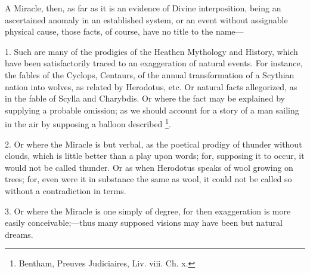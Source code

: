 A Miracle, then, as far as it is an evidence of
Divine interposition, being an ascertained anomaly in an established
system, or an event without assignable physical cause, those facts, of
course, have no title to the name—


1. Such are many of the prodigies of the Heathen
Mythology and History, which have been satisfactorily traced to an
exaggeration of natural events. For instance, the fables of the
Cyclops, Centaurs, of the annual transformation of a Scythian nation
into wolves, as related by Herodotus, etc. Or natural facts
allegorized, as in the fable of Scylla and Charybdis. Or where the
fact may be explained by supplying a probable omission; as we should
account for a story of a man sailing in the air by supposing a balloon
described \footnote{Bentham, Preuves Judiciaires, Liv. viii. Ch. x.}.

2. Or where the Miracle is but verbal, as the
poetical prodigy of thunder without clouds, which is little better
than a play upon words; for, supposing it to occur, it would not be
called thunder. Or as when Herodotus speaks of wool growing on trees;
for, even were it in substance the same as wool, it could not be
called so without a contradiction in terms.

3. Or where the Miracle is one simply of degree,
for then exaggeration is more easily conceivable;—thus many supposed
visions may have been but natural dreams.

